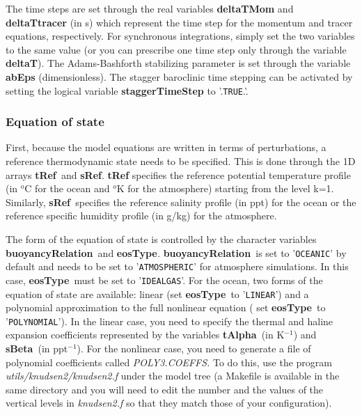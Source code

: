 The time steps are set through the real variables \textbf{deltaTMom }and 
\textbf{deltaTtracer }(in s) which represent the time step for the momentum
and tracer equations, respectively. For synchronous integrations, simply set
the two variables to the same value (or you can prescribe one time step only
through the variable \textbf{deltaT}). The Adams-Bashforth stabilizing
parameter is set through the variable \textbf{abEps }(dimensionless). The
stagger baroclinic time stepping can be activated by setting the logical
variable \textbf{staggerTimeStep }to '.\texttt{TRUE}.'.

\subsubsection{Equation of state}

First, because the model equations are written in terms of perturbations, a
reference thermodynamic state needs to be specified. This is done through
the 1D arrays \textbf{tRef}\textit{\ }and \textbf{sRef}. \textbf{tRef }%
specifies the reference potential temperature profile (in $^{o}$C for
the ocean and $^{o}$K for the atmosphere) starting from the level
k=1. Similarly, \textbf{sRef}\textit{\ }specifies the reference salinity
profile (in ppt) for the ocean or the reference specific humidity profile
(in g/kg) for the atmosphere.

The form of the equation of state is controlled by the character variables 
\textbf{buoyancyRelation}\textit{\ }and \textbf{eosType}\textit{. }\textbf{%
buoyancyRelation}\textit{\ }is set to '\texttt{OCEANIC}' by default and
needs to be set to '\texttt{ATMOSPHERIC}' for atmosphere simulations. In
this case, \textbf{eosType}\textit{\ }must be set to '\texttt{IDEALGAS}'.
For the ocean, two forms of the equation of state are available: linear (set 
\textbf{eosType}\textit{\ }to '\texttt{LINEAR}') and a polynomial
approximation to the full nonlinear equation ( set \textbf{eosType}\textit{\ 
}to '\texttt{POLYNOMIAL}'). In the linear case, you need to specify the
thermal and haline expansion coefficients represented by the variables 
\textbf{tAlpha}\textit{\ }(in K$^{-1}$) and \textbf{sBeta}\textit{\ }(in ppt$%
^{-1}$). For the nonlinear case, you need to generate a file of polynomial
coefficients called \textit{POLY3.COEFFS. }To do this, use the program 
\textit{utils/knudsen2/knudsen2.f }under the model tree (a Makefile is
available in the same directory and you will need to edit the number and the
values of the vertical levels in \textit{knudsen2.f }so that they match
those of your configuration). \textit{\ }

